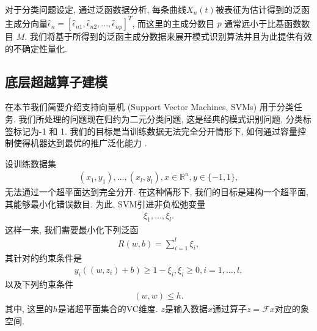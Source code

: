 对于分类问题设定, 通过泛函数据分析, 每条曲线$X_{n}(t)$被表征为估计得到的泛函主成分向量$\hat{\epsilon}_{n} = [\hat{\epsilon}_{n1},\hat{\epsilon}_{n2},...,\hat{\epsilon}_{np}]^T$, 而这里的主成分数目 $p$ 通常远小于比基函数数目 $M$. 我们将基于所得到的泛函主成分数据来展开模式识别算法并且为此提供有效的不确定性量化.

\subsection{底层超越算子建模}
\label{SVMs}
在本节我们简要介绍支持向量机 (Support Vector Machines, SVMs) 用于分类任务\citet{vapnik1995,vapnik1998,Vapnik2006}. 我们所处理的问题现在归约为二元分类问题, 这是经典的模式识别问题, 分类标签标记为-1 和 1. 我们的目标是当训练数据无法完全分开情形下, 如何通过容量控制使得机器达到最优的推广泛化能力 \citep{Cortes1995}. 

设训练数据集
\begin{align*}
(x_1,y_1),\ldots,(x_l,y_l), x \in \mathbb{R}^{n}, y \in \{-1,1\},
\end{align*}
无法通过一个超平面达到完全分开. 在这种情形下, 我们的目标是建构一个超平面, 其能够最小化错误数目. 为此, SVM引进非负松弛变量
\begin{align*}
\xi_1,\ldots,\xi_l.
\end{align*}
这样一来, 我们需要最小化下列泛函
\begin{align}
R(w,b) = \sum_{i=1}^{l}\xi_i,
\end{align}
其针对的约束条件是
\begin{align}
y_{i}((w,z_{i}) + b) \geq 1 - \xi_{i}, \xi_{i} \geq 0, i = 1,\ldots,l,
\end{align}
以及下列约束条件
\begin{align}
(w,w) \leq h.
\end{align}
其中, 这里的$h$是诸超平面集合的VC维度. $z$是输入数据$x$通过算子$z = \mathcal{F}x$对应的象空间.

